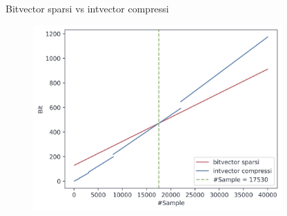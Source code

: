 \documentclass[]{beamer}
\begin{document}
\begin{frame}{Bitvector sparsi vs intvector compressi}
  \begin{figure}[H]
    \centering
    \includegraphics[width=0.85\textwidth]{img/bv_vs_iv.png}
  \end{figure}
\end{frame}
\end{document}
